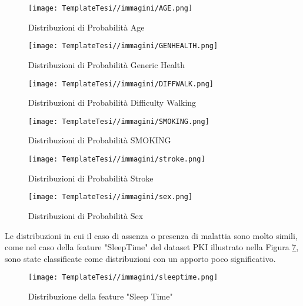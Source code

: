 \begin{figure}[H]
    \centering
    \texttt{[image: TemplateTesi//immagini/AGE.png]}
    \caption{Distribuzioni di Probabilità Age}
    \label{fig:dpPKIAge}
\end{figure}
\begin{figure}[H]
    \centering
    \texttt{[image: TemplateTesi//immagini/GENHEALTH.png]}
    \caption{Distribuzioni di Probabilità Generic Health}
    \label{fig:dpPKIGenhealth}
\end{figure}

\begin{figure}[H]
    \centering
    \texttt{[image: TemplateTesi//immagini/DIFFWALK.png]}
    \caption{Distribuzioni di Probabilità Difficulty Walking}
    \label{fig:dpPKIdiffwalk}
\end{figure}

\begin{figure}[H]
    \centering
    \texttt{[image: TemplateTesi//immagini/SMOKING.png]}
    \caption{Distribuzioni di Probabilità SMOKING}
    \label{fig:dpPKISMOKING}
\end{figure}

\begin{figure}[H]
    \centering
    \texttt{[image: TemplateTesi//immagini/stroke.png]}
    \caption{Distribuzioni di Probabilità  Stroke}
    \label{fig:dpPKIStroke}
\end{figure}
\begin{figure}[H]
    \centering
    \texttt{[image: TemplateTesi//immagini/sex.png]}
    \caption{Distribuzioni di Probabilità Sex}
    \label{fig:dpPKISex}
\end{figure}
Le distribuzioni in cui il caso di assenza o presenza di malattia sono molto simili, come nel caso della feature "SleepTime" del dataset PKI illustrato nella Figura \ref{fig:sleeptime}, sono state classificate come distribuzioni con un apporto poco significativo.
\begin{figure}[H]
    \centering
    \texttt{[image: TemplateTesi//immagini/sleeptime.png]}
    \caption{Distribuzione della feature "Sleep Time"}
    \label{fig:sleeptime}
\end{figure}


